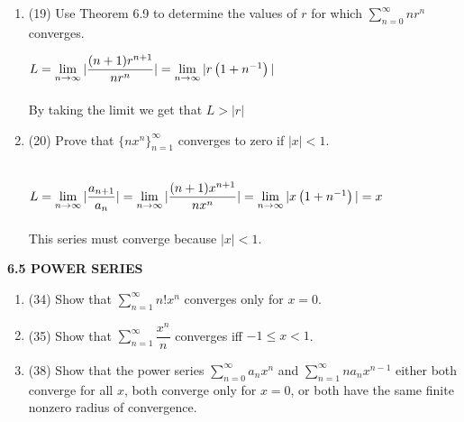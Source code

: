 \documentclass[fleqn]{article}
\begin{document}
  \begin{enumerate}
    \item (19) Use Theorem 6.9 to determine the values of $r$ for which $\sum\limits_{n=0}^{\infty} n r^n$ converges.

      \textcolor{hwColor}{
        $ 
          \\
          L=\lim\limits_{n \to \infty} |\dfrac{(n+1) r^{n+1}}{n r^n}|
          =\lim\limits_{n \to \infty} |r \left(1+n^{-1}\right)|
        $
        \\
        \\
        By taking the limit we get that $L>|r|$
        \\
      }

    \item (20) Prove that $\{ n x^n\}_{n=1}^{\infty}$ converges to zero if $|x| < 1$.

      \textcolor{hwColor}{
        \\
        $
          L=\lim\limits_{n \to \infty} |\dfrac{a_{n+1}}{a_n}|
          =\lim\limits_{n \to \infty} |\dfrac{(n+1) x^{n+1}}{n x^n}|
          \\
          \\
          \\
          =\lim\limits_{n \to \infty} |x\left(1+n^{-1}\right)|=x
        $
        \\
        \\
        This series must converge because $|x|<1$.
      }

  \end{enumerate}


  \textbf{6.5 POWER SERIES}
  \begin{enumerate}
    \item (34) Show that $\sum\limits_{n=1}^{\infty} n! x^n$ converges only for $x=0$.

          

    \item (35) Show that $\sum\limits_{n=1}^{\infty} \dfrac{x^n}{n}$ converges iff $-1 \leq x <1$.

          

    \item (38) Show that the power series $\sum\limits_{n=0}^{\infty} a_n x^n$ and $\sum\limits_{n=1}^{\infty} n a_n x^{n-1}$ either both converge for all 
    $x$, both converge only for $x=0$, or both have the same finite nonzero radius of convergence.

          

  \end{enumerate}
\end{document}
